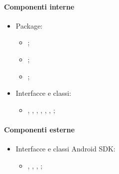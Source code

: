 \documentclass[../Funzionalita.tex]{subfiles}
\begin{document}
			\paragraph*{Componenti interne}
			\begin{itemize}
			
				\item Package:
				\begin{itemize}
					\item[] \presenter;
					\item[] \view;
					\item[] \model;
				\end{itemize}
				
				\item Interfacce e classi:
				\begin{itemize}
					\item[] \BeaconPos, \BeaconPowerPos, \BeaconPowerArea, \BeaconPowerAreaView, \BeaconPowerAreaViewImp, \BeaconPowerAreaActivity, \InformationManager;
				\end{itemize}
			\end{itemize}
				
			\paragraph*{Componenti esterne}
			\begin{itemize}
			
				\item Interfacce e classi \Gls{Android} SDK:
				\begin{itemize}
					\item[] \View, \Canvas, \AppCompatActivity, \InformationListener;
				\end{itemize}
			\end{itemize}
\end{document}
